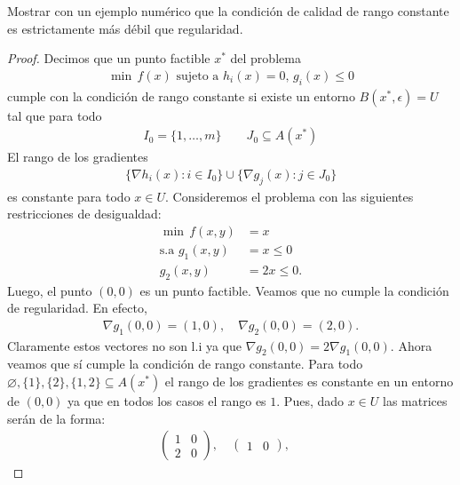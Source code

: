 \documentclass{article}
\newenvironment{theorem}[2][Ejercicio]{\begin{trivlist}
\item[\hskip \labelsep {\bfseries #1}\hskip \labelsep {\bfseries #2.}]}{\end{trivlist}}
\begin{document}
\begin{theorem}{7}
    Mostrar con un ejemplo numérico que la condición de calidad de rango constante es estrictamente más débil que regularidad.
\end{theorem}

\begin{proof}
    Decimos que un punto factible \( x^* \) del problema \begin{align*}
        \min \, f(x) \text{ sujeto a } h_i(x) = 0, \, g_i(x) \leq 0
    \end{align*} cumple con la condición de rango constante si existe un entorno \( B(x^*, \epsilon) = U \) tal que para todo \begin{align*}
        I_0 = \{ 1, \ldots, m \} \qquad J_0 \subseteq A(x^*)
    \end{align*}
    El rango de los gradientes \begin{align*}
        \{ \nabla h_i(x) : i \in I_0 \} \cup \{ \nabla g_j(x) : j \in J_0 \}
    \end{align*}
    es constante para todo \( x \in U \). Consideremos el problema con las siguientes restricciones de desigualdad: \begin{align*}
        \min \,                f(x, y) & = x          \\
        \text{s.a } g_1(x, y)          & = x \leq 0   \\
        g_2(x, y)                      & = 2x \leq 0.
    \end{align*}
    Luego, el punto \( (0, 0) \) es un punto factible. Veamos que no cumple la condición de regularidad. En efecto, \begin{align*}
        \nabla g_1(0, 0) = (1, 0), \quad \nabla g_2(0, 0) = (2, 0).
    \end{align*}
    Claramente estos vectores no son l.i ya que \( \nabla g_2(0, 0) = 2 \nabla g_1(0, 0) \). Ahora veamos que sí cumple la condición de rango constante.
    Para todo \( \varnothing, \{1\}, \{2\}, \{1, 2\} \subseteq A(x^*) \) el rango de los gradientes es constante en un entorno de \( (0, 0) \) ya que en todos los casos el rango es \( 1 \). Pues, dado \( x \in U \) las matrices serán de la forma: \begin{align*}
        \begin{pmatrix}
            1 & 0 \\
            2 & 0
        \end{pmatrix}, \quad
        \begin{pmatrix}
            1 & 0
        \end{pmatrix}, \quad

\end{align*}
\end{proof}
\end{document}
